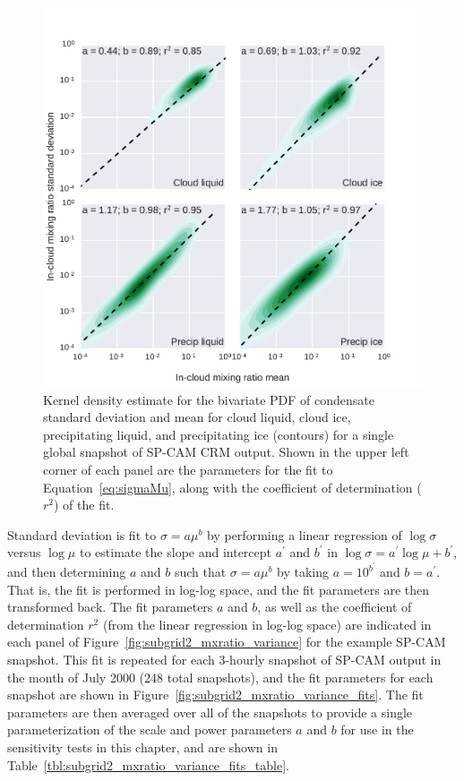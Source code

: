 \begin{figure}[htbp]
\centering
\includegraphics{graphics/subgrid2_mxratio_variance.pdf}
\caption{\label{fig:subgrid2_mxratio_variance}Kernel density estimate
for the bivariate PDF of condensate standard deviation and mean for
cloud liquid, cloud ice, precipitating liquid, and precipitating ice
(contours) for a single global snapshot of SP-CAM CRM output. Shown in
the upper left corner of each panel are the parameters for the fit to
Equation~\ref{eq:sigmaMu}, along with the coefficient of determination
(\(r^2\)) of the fit.}\label{fig:subgrid2ux5fmxratioux5fvariance}
\end{figure}

Standard deviation is fit to \(\sigma = a \mu^b\) by performing a linear
regression of \(\log\sigma\) versus \(\log \mu\) to estimate the slope
and intercept \(a^{\prime}\) and \(b^{\prime}\) in
\(\log \sigma = a^{\prime} \log \mu + b^{\prime}\), and then determining
\(a\) and \(b\) such that \(\sigma = a \mu^b\) by taking
\(a = 10^{b^{\prime}}\) and \(b = a^{\prime}\). That is, the fit is
performed in log-log space, and the fit parameters are then transformed
back. The fit parameters \(a\) and \(b\), as well as the coefficient of
determination \(r^2\) (from the linear regression in log-log space) are
indicated in each panel of Figure~\ref{fig:subgrid2_mxratio_variance}
for the example SP-CAM snapshot. This fit is repeated for each 3-hourly
snapshot of SP-CAM output in the month of July 2000 (248 total
snapshots), and the fit parameters for each snapshot are shown in
Figure~\ref{fig:subgrid2_mxratio_variance_fits}. The fit parameters are
then averaged over all of the snapshots to provide a single
parameterization of the scale and power parameters \(a\) and \(b\) for
use in the sensitivity tests in this chapter, and are shown in
Table~\ref{tbl:subgrid2_mxratio_variance_fits_table}.

